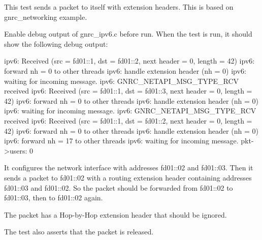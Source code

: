 This test sends a packet to itself with extension headers. This is based on gnrc\+\_\+networking example.

Enable debug output of {\ttfamily gnrc\+\_\+ipv6.\+c} before run. When the test is run, it should show the following debug output\+:


\begin{DoxyCode}
ipv6: Received (src = fd01::1, dst = fd01::2, next header = 0, length = 42)
ipv6: forward nh = 0 to other threads
ipv6: handle extension header (nh = 0)
ipv6: waiting for incoming message.
ipv6: GNRC\_NETAPI\_MSG\_TYPE\_RCV received
ipv6: Received (src = fd01::1, dst = fd01::3, next header = 0, length = 42)
ipv6: forward nh = 0 to other threads
ipv6: handle extension header (nh = 0)
ipv6: waiting for incoming message.
ipv6: GNRC\_NETAPI\_MSG\_TYPE\_RCV received
ipv6: Received (src = fd01::1, dst = fd01::2, next header = 0, length = 42)
ipv6: forward nh = 0 to other threads
ipv6: handle extension header (nh = 0)
ipv6: forward nh = 17 to other threads
ipv6: waiting for incoming message.
pkt->users: 0
\end{DoxyCode}


It configures the network interface with addresses fd01\+:\+:02 and fd01\+:\+:03. Then it sends a packet to fd01\+:\+:02 with a routing extension header containing addresses fd01\+:\+:03 and fd01\+:\+:02. So the packet should be forwarded from fd01\+:\+:02 to fd01\+:\+:03, then to fd01\+:\+:02 again.

The packet has a Hop-\/by-\/\+Hop extension header that should be ignored.

The test also asserts that the packet is released. 